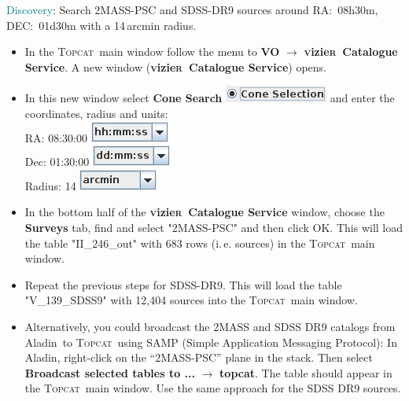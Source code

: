 \documentclass [a4paper, 12pt]{article}
\newcommand{\aladin}{{\textsc{A}{ladin}}}
\newcommand{\topcat}{{\textsc{Topcat}}}
\newcommand{\vizier}{{\textsc{v}izie\textsc{r}}}
\begin{document}
\noindent \textcolor{teal}{Discovery}: Search 2MASS-PSC and SDSS-DR9 sources 
around RA:~08h30m, DEC:~01d30m with a 14\,arcmin radius.
\begin{itemize}
    \item In the \topcat\ main window follow the menu to \textbf{VO} 
    $\rightarrow$ \textbf{\vizier\ Catalogue Service}. A new window 
    (\textbf{\vizier\ Catalogue Service}) opens. 
    \item In this new window select \textbf{Cone Search} 
    \includegraphics[width=0.2 
    \textwidth]{../images/topcat_vizier_cone-search.png} and enter the 
    coordinates, radius and units:\\
    RA: 08:30:00 \includegraphics[width=0.1 
    \textwidth]{../images/topcat_vizier_hms.png}\\
    Dec: 01:30:00 \includegraphics[width=0.1 
    \textwidth]{../images/topcat_vizier_dms.png}\\
    Radius: 14 \includegraphics[width=0.1 
    \textwidth]{../images/topcat_vizier_arcmin.png}
    \item In the bottom half of the \textbf{\vizier\ Catalogue Service} window, 
    choose the \textbf{Surveys} tab, find and select "2MASS-PSC" and then click 
    OK. This will load the table "II\_246\_out" with 683 rows (i.\,e. sources) 
    in 
    the \topcat\ main window. 
    \item Repeat the previous steps for SDSS-DR9. This will load the table 
    "V\_139\_SDSS9" with 12,404 sources into the \topcat\ main window. 
    \item Alternatively, you could broadcast the 2MASS and SDSS DR9 catalogs 
    from \aladin\ to \topcat\ using SAMP (Simple Application Messaging 
    Protocol): In \aladin, right-click on the “2MASS-PSC” plane in the stack. 
    Then select \textbf{Broadcast selected tables to ...} $\rightarrow$ 
    \textbf{topcat}. The table should appear in the \topcat\ main window. Use 
    the same approach for the SDSS DR9 sources.
    \begin{figure}[H]
        \center

\end{figure}
\end{itemize}
\end{document}
